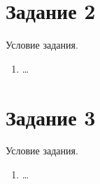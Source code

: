 \documentclass[fleqn,12pt, a4paper]{article}
\begin{document}
\newpage
\section*{Задание 2}
Условие задания.
\begin{enumerate}[label=(\roman{*})]
	\item \ldots
\end{enumerate}

\newpage
\section*{Задание 3}
Условие задания.
\begin{enumerate}[label=(\roman{*})]
	\item \ldots
\end{enumerate}
\end{document}
